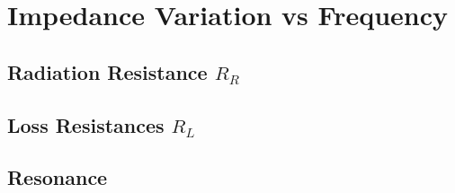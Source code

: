\section{Impedance Variation vs Frequency}

\subsection{Radiation Resistance $R_R$}
\subsection{Loss Resistances $R_L$}
\subsection{Resonance}
